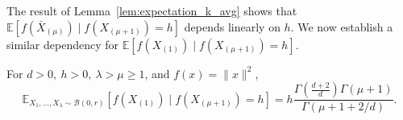 The result of Lemma~\ref{lem:expectation_k_avg} shows that $\mathbb{E}\left[f\left(\bar{X}_{(\mu)}\right)\mid f(X_{(\mu+1)})=h\right]$ depends linearly on $h.$ We now establish a similar dependency for 
$\mathbb{E}\left[f\left(X_{(1)}\right)\mid f(X_{(\mu+1)})=h\right]$.
\begin{lemma}\label{lm4} \label{lem:expectation_1_cond} For $d>0,\ h>0,\ \lambda>\mu\geq1$,  and $f(x)=\lVert x\rVert ^2$,
$$\mathbb{E}_{X_1,...,X_\lambda\sim\mathcal{B}(0,r)}\left[f\left(X_{(1)}\right)\mid f(X_{(\mu+1)})=h\right] = h \frac{\Gamma(\frac{d+2}{d})\Gamma(\mu+1)}{\Gamma(\mu+1+2/d)}.$$
\end{lemma}
